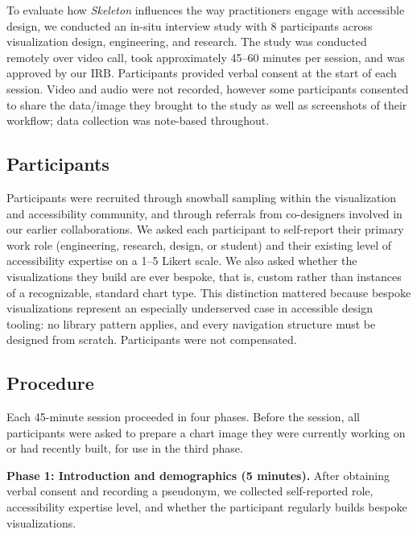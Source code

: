 \documentclass[12pt]{cmuthesis}
\begin{document}
To evaluate how \textit{Skeleton} influences the way practitioners engage with accessible design, we conducted an in-situ interview study with 8 participants across visualization design, engineering, and research. The study was conducted remotely over video call, took approximately 45--60 minutes per session, and was approved by our IRB. Participants provided verbal consent at the start of each session. Video and audio were not recorded, however some participants consented to share the data/image they brought to the study as well as screenshots of their workflow; data collection was note-based throughout.

\subsection{Participants}

Participants were recruited through snowball sampling within the visualization and accessibility community, and through referrals from co-designers involved in our earlier collaborations. We asked each participant to self-report their primary work role (engineering, research, design, or student) and their existing level of accessibility expertise on a 1--5 Likert scale. We also asked whether the visualizations they build are ever bespoke, that is, custom rather than instances of a recognizable, standard chart type. This distinction mattered because bespoke visualizations represent an especially underserved case in accessible design tooling: no library pattern applies, and every navigation structure must be designed from scratch. Participants were not compensated.

\subsection{Procedure}

Each 45-minute session proceeded in four phases. Before the session, all participants were asked to prepare a chart image they were currently working on or had recently built, for use in the third phase.

\textbf{Phase 1: Introduction and demographics (5 minutes).} After obtaining verbal consent and recording a pseudonym, we collected self-reported role, accessibility expertise level, and whether the participant regularly builds bespoke visualizations.

\end{document}
